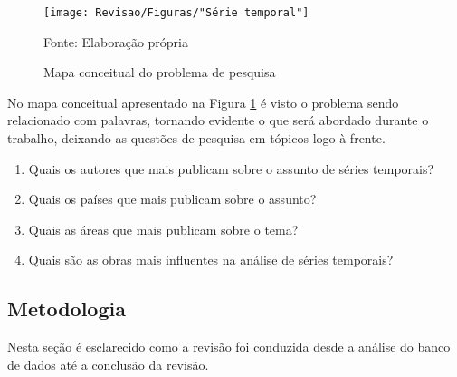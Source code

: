 \begin{figure}[H]
	\centering
	\caption{Mapa conceitual do problema de pesquisa}
	\label{fig:serie-temporal}
	\texttt{[image: Revisao/Figuras/"Série temporal"]}
	
	Fonte: Elaboração própria 
\end{figure}

No mapa conceitual apresentado na Figura \ref{fig:serie-temporal} é visto o problema sendo relacionado com palavras, tornando evidente o que será abordado durante o trabalho, deixando as questões de pesquisa em tópicos logo à frente.

\begin{enumerate}[start=1, label = {\textbf{Q} \arabic* } ]
	\item \label{questão:rev1}Quais os autores que mais publicam sobre o assunto de séries temporais?
	\item \label{questão:rev2}Quais os países que mais publicam sobre o assunto? 
	\item \label{questão:rev3}Quais as áreas que mais publicam sobre o tema?
	\item \label{questão:rev4}Quais são as obras mais influentes na análise de séries temporais?
\end{enumerate}

\subsection{Metodologia}\label{subsec:met da revisão}

Nesta seção é esclarecido como a revisão foi conduzida desde a análise do banco de dados até a conclusão da revisão.

